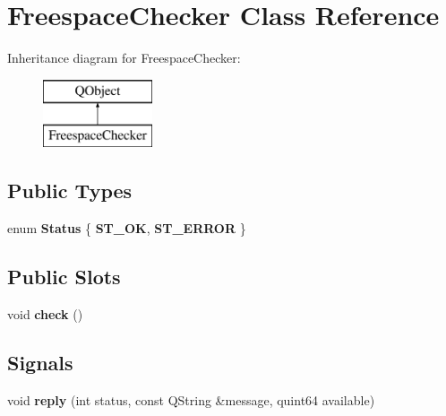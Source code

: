 \hypertarget{class_freespace_checker}{}\section{Freespace\+Checker Class Reference}
\label{class_freespace_checker}
Inheritance diagram for Freespace\+Checker\+:\begin{figure}[H]
\begin{center}
\leavevmode
\includegraphics[height=2.000000cm]{class_freespace_checker}
\end{center}
\end{figure}
\subsection*{Public Types}
\begin{DoxyCompactItemize}
\item 
\mbox{\label{class_freespace_checker_ac049779e76e197b16694f783eea84704}} 
enum {\bfseries Status} \{ {\bfseries S\+T\+\_\+\+OK}, 
{\bfseries S\+T\+\_\+\+E\+R\+R\+OR}
 \}
\end{DoxyCompactItemize}
\subsection*{Public Slots}
\begin{DoxyCompactItemize}
\item 
\mbox{\label{class_freespace_checker_afb1648f73f72526df2dc0a25e047bbfd}} 
void {\bfseries check} ()
\end{DoxyCompactItemize}
\subsection*{Signals}
\begin{DoxyCompactItemize}
\item 
\mbox{\label{class_freespace_checker_add7c87cc71950e7dfd315e4d17efe72c}} 
void {\bfseries reply} (int status, const Q\+String \&message, quint64 available)
\end{DoxyCompactItemize}
